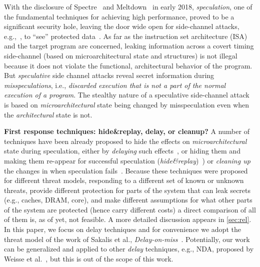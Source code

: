 With the disclosure of Spectre~\cite{kocher_spectre_2018} and Meltdown~\cite{lipp_meltdown_2018} in early 2018, \emph{speculation}, one of the fundamental techniques for achieving high
performance, proved to be a significant security hole, leaving the door wide
open for side-channel attacks, e.g.,~\cite{bernstein2005cache,yarom_flush+_2014,liu15llc,irazoqui_cross_2016}, to ``see'' protected data~\cite{kocher_spectre_2018,lipp_meltdown_2018}.
As far as the instruction set architecture (ISA) and the target program are
concerned, leaking information across a covert timing side-channel (based on microarchitectural state and structures) is not illegal
because it does not violate the functional, architectural behavior of the program.
But \emph{speculative} side channel attacks reveal secret information during \emph{misspeculations}, 
i.e., \emph{discarded execution that is not a part of the normal execution of a program}.
The stealthy nature of a speculative side-channel attack is based on
\emph{microarchitectural} state being changed by misspeculation even when the \emph{architectural}
state is not.

\noindent \textbf{First response techniques: hide\&replay, delay, or cleanup?} A number of techniques have been already proposed to hide the effects on \emph{microarchitectural} state during speculation, either by \emph{delaying} such effects~\cite{sakalis2019efficient,weisse2019nda,tts}, or hiding them and making them re-appear for successful speculation (\emph{hide\&replay})~\cite{yan_invisispec:MICRO2018,sakalis2019ghost}) or \emph{cleaning up} the changes in when speculation fails~\cite{saileshwar2019cleanupspec}. Because these techniques were proposed for different threat models, responding to a different set of known or unknown threats, provide different protection for parts of the system that can leak secrets (e.g., caches, DRAM, core), and make different assumptions for what other parts of the system are protected (hence carry different costs) a direct comparison of all of them is, as of yet, not feasible.
A more detailed discussion appears in \autoref{sec:rel}. 
In this paper, we focus on delay techniques and for convenience we adopt the threat model of the work of Sakalis et al., \emph{Delay-on-miss}~\cite{sakalis2019ghost}. Potentially, our work can be generalized and applied to other \emph{delay} techniques, e.g., NDA, proposed by Weisse et al.~\cite{weisse2019nda}, but this is out of the scope of this work.

